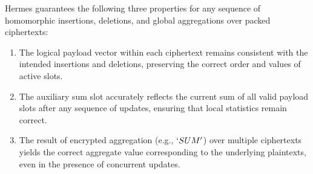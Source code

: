 \documentclass[sigconf,nonacm]{acmart}
\begin{document}
\begin{theorem}
  Hermes guarantees the following three properties for any sequence of homomorphic insertions, deletions, and global aggregations over packed ciphertexts:
  \begin{enumerate}
    \item The logical payload vector within each ciphertext remains consistent with the intended insertions and deletions, preserving the correct order and values of active slots.
    \item The auxiliary sum slot accurately reflects the current sum of all valid payload slots after any sequence of updates, ensuring that local statistics remain correct.
    \item The result of encrypted aggregation (e.g., $`SUM'$) over multiple ciphertexts yields the correct aggregate value corresponding to the underlying plaintexts, even in the presence of concurrent updates.
  \end{enumerate}
\end{theorem}
\end{document}
